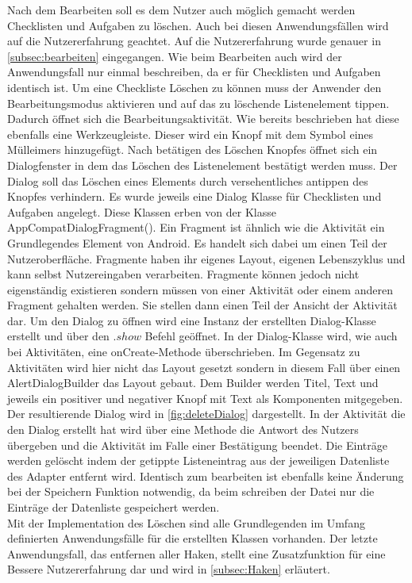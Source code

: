 Nach dem Bearbeiten soll es dem Nutzer auch möglich gemacht werden Checklisten und Aufgaben zu löschen. Auch bei diesen Anwendungsfällen wird auf die Nutzererfahrung geachtet. Auf die Nutzererfahrung wurde genauer in \autoref{subsec:bearbeiten} eingegangen. Wie beim Bearbeiten auch wird der Anwendungsfall nur einmal beschreiben, da er für Checklisten und Aufgaben identisch ist. Um eine Checkliste Löschen zu können muss der Anwender den Bearbeitungsmodus aktivieren und auf das zu löschende Listenelement tippen. Dadurch öffnet sich die Bearbeitungsaktivität. Wie bereits beschrieben hat diese ebenfalls eine Werkzeugleiste. Dieser wird ein Knopf mit dem Symbol eines Mülleimers hinzugefügt. Nach betätigen des Löschen Knopfes öffnet sich ein Dialogfenster in dem das Löschen des Listenelement bestätigt werden muss. Der Dialog soll das Löschen eines Elements durch versehentliches antippen des Knopfes verhindern. Es wurde jeweils eine Dialog Klasse für Checklisten und Aufgaben angelegt. Diese Klassen erben von der Klasse AppCompatDialogFragment(). Ein Fragment ist ähnlich wie die Aktivität ein Grundlegendes Element von Android. Es handelt sich dabei um einen Teil der Nutzeroberfläche. Fragmente haben ihr eigenes Layout, eigenen Lebenszyklus und kann selbst Nutzereingaben verarbeiten. Fragmente können jedoch nicht eigenständig existieren sondern müssen von einer Aktivität oder einem anderen Fragment gehalten werden. Sie stellen dann einen Teil der Ansicht der Aktivität dar. Um den Dialog zu öffnen wird eine Instanz der erstellten Dialog-Klasse erstellt und über den $.show$ Befehl geöffnet. In der Dialog-Klasse wird, wie auch bei Aktivitäten, eine onCreate-Methode überschrieben. Im Gegensatz zu Aktivitäten wird hier nicht das Layout gesetzt sondern in diesem Fall über einen AlertDialogBuilder das Layout gebaut. Dem Builder werden Titel, Text und jeweils ein positiver und negativer Knopf mit Text als Komponenten mitgegeben. Der resultierende Dialog wird in \autoref{fig:deleteDialog} dargestellt. In der Aktivität die den Dialog erstellt hat wird über eine Methode die Antwort des Nutzers übergeben und die Aktivität im Falle einer Bestätigung beendet. Die Einträge werden gelöscht indem der getippte Listeneintrag aus der jeweiligen Datenliste des Adapter entfernt wird. Identisch zum bearbeiten ist ebenfalls keine Änderung bei der Speichern Funktion notwendig, da beim schreiben der Datei nur die Einträge der Datenliste gespeichert werden.\\
Mit der Implementation des Löschen sind alle Grundlegenden im Umfang definierten Anwendungsfälle für die erstellten Klassen vorhanden. Der letzte Anwendungsfall, das entfernen aller Haken, stellt eine Zusatzfunktion für eine Bessere Nutzererfahrung dar und wird in \autoref{subsec:Haken} erläutert.

